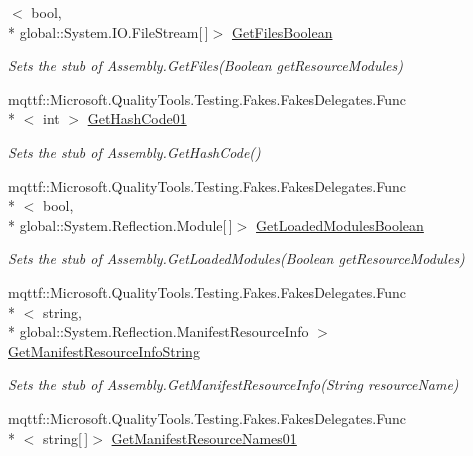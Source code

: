 \begin{DoxyCompactItemize}
$<$ bool, \\*
global\-::\-System.\-I\-O.\-File\-Stream\mbox{[}$\,$\mbox{]}$>$ \hyperlink{class_system_1_1_reflection_1_1_fakes_1_1_stub_assembly_a762161788938208182fd455ca3a18b38}{Get\-Files\-Boolean}
\begin{DoxyCompactList}\small\item\em Sets the stub of Assembly.\-Get\-Files(\-Boolean get\-Resource\-Modules)\end{DoxyCompactList}\item 
mqttf\-::\-Microsoft.\-Quality\-Tools.\-Testing.\-Fakes.\-Fakes\-Delegates.\-Func\\*
$<$ int $>$ \hyperlink{class_system_1_1_reflection_1_1_fakes_1_1_stub_assembly_a909d6b74a4e0593c29585eae91f5b662}{Get\-Hash\-Code01}
\begin{DoxyCompactList}\small\item\em Sets the stub of Assembly.\-Get\-Hash\-Code()\end{DoxyCompactList}\item 
mqttf\-::\-Microsoft.\-Quality\-Tools.\-Testing.\-Fakes.\-Fakes\-Delegates.\-Func\\*
$<$ bool, \\*
global\-::\-System.\-Reflection.\-Module\mbox{[}$\,$\mbox{]}$>$ \hyperlink{class_system_1_1_reflection_1_1_fakes_1_1_stub_assembly_ae6dc4182baa6ef5b2906934121d2f5b9}{Get\-Loaded\-Modules\-Boolean}
\begin{DoxyCompactList}\small\item\em Sets the stub of Assembly.\-Get\-Loaded\-Modules(\-Boolean get\-Resource\-Modules)\end{DoxyCompactList}\item 
mqttf\-::\-Microsoft.\-Quality\-Tools.\-Testing.\-Fakes.\-Fakes\-Delegates.\-Func\\*
$<$ string, \\*
global\-::\-System.\-Reflection.\-Manifest\-Resource\-Info $>$ \hyperlink{class_system_1_1_reflection_1_1_fakes_1_1_stub_assembly_a036ff08f73e072de61998036414d1805}{Get\-Manifest\-Resource\-Info\-String}
\begin{DoxyCompactList}\small\item\em Sets the stub of Assembly.\-Get\-Manifest\-Resource\-Info(\-String resource\-Name)\end{DoxyCompactList}\item 
mqttf\-::\-Microsoft.\-Quality\-Tools.\-Testing.\-Fakes.\-Fakes\-Delegates.\-Func\\*
$<$ string\mbox{[}$\,$\mbox{]}$>$ \hyperlink{class_system_1_1_reflection_1_1_fakes_1_1_stub_assembly_a966b734d1191b6d92f56bb30e92ce792}{Get\-Manifest\-Resource\-Names01}

\end{DoxyCompactItemize}
